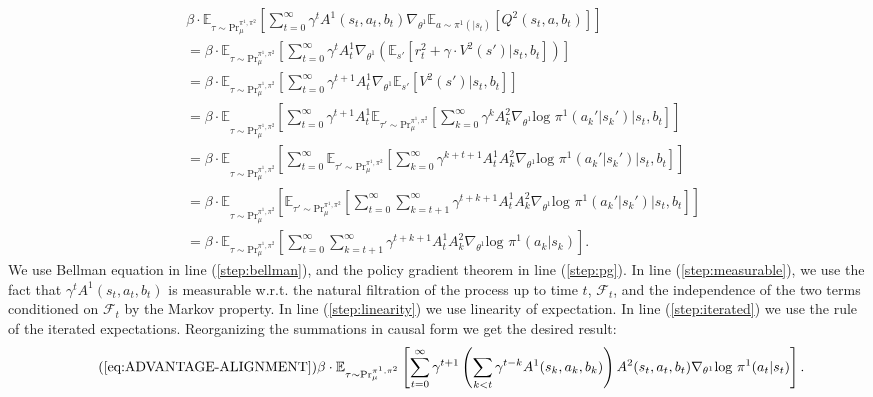 \documentclass{article} \usepackage{iclr2025_conference,times}
\begin{document}
\begin{align}
    &\beta \cdot \mathbb{E}_{\tau \sim \text{Pr}_{\mu}^{\pi^1, \pi^2}} \left[\sum_{t=0}^\infty \gamma^t A^{1}(s_t, a_t, b_t)\nabla_{\theta^1} \mathbb{E}_{a \sim \pi^1(|s_t)} [Q^2(s_t, a, b_t)] \right] \\
    &= \beta \cdot \mathbb{E}_{\tau \sim \text{Pr}_{\mu}^{\pi^1, \pi^2}} \left[\sum_{t=0}^\infty \gamma^t A^{1}_t\nabla_{\theta^1} \left( \mathbb{E}_{s'}\left[r^2_t + \gamma \cdot V^2(s')\biggr| s_t,b_t\right] \right) \right] \label{step:bellman}\\
    &= \beta \cdot \mathbb{E}_{\tau \sim \text{Pr}_{\mu}^{\pi^1, \pi^2}} \left[\sum_{t=0}^\infty \gamma^{t+1} A^{1}_t\nabla_{\theta^1} \mathbb{E}_{s'}\left[V^2(s')\biggr| s_t,b_t\right] \right]\\
    &= \beta \cdot \mathbb{E}\underset{\tau \sim \text{Pr}_{\mu}^{\pi^1, \pi^2}}{} \left[\sum_{t=0}^\infty \gamma^{t+1} A^{1}_t \mathbb{E}_{\tau' \sim \text{Pr}_{\mu}^{\pi^1, \pi^2}}\left[\sum_{k=0}^\infty \gamma^{k} A^{2}_k\nabla_{\theta^1}\text{log } \pi^1(a_k'|s_k')\biggr| s_t,b_t\right]  \right] \label{step:pg}\\
    &= \beta \cdot \mathbb{E}\underset{\tau \sim \text{Pr}_{\mu}^{\pi^1, \pi^2}}{} \left[\sum_{t=0}^\infty  \mathbb{E}_{\tau' \sim \text{Pr}_{\mu}^{\pi^1, \pi^2}}\left[\sum_{k=0}^\infty \gamma^{k+t+1} A^{1}_t  A^{2}_k\nabla_{\theta^1}\text{log } \pi^1(a_k'|s_k')\biggr| s_t,b_t\right]  \right] \label{step:measurable}\\
    &= \beta \cdot \mathbb{E}\underset{\tau \sim \text{Pr}_{\mu}^{\pi^1, \pi^2}}{} \left[\mathbb{E}_{\tau' \sim \text{Pr}_{\mu}^{\pi^1, \pi^2}}\left[\sum_{t=0}^\infty  \sum_{k=t+1}^\infty \gamma^{t+k+1} A^{1}_t  A^{2}_k\nabla_{\theta^1}\text{log } \pi^1(a_k'|s_k')\biggr| s_t,b_t \right]  \right] \label{step:linearity}\\
    &= \beta \cdot \mathbb{E}_{\tau \sim \text{Pr}_{\mu}^{\pi^1, \pi^2}} \left[\sum_{t=0}^\infty  \sum_{k=t+1}^\infty \gamma^{t+k+1} A^{1}_t  A^{2}_k\nabla_{\theta^1}\text{log } \pi^1(a_k|s_k) \right]. \label{step:iterated}
\end{align}
We use Bellman equation in line (\ref{step:bellman}), and the policy gradient theorem in line (\ref{step:pg}). In line (\ref{step:measurable}), we use the fact that $\gamma^t A^{1}(s_t, a_t, b_t)$ is measurable w.r.t. the natural filtration of the process up to time $t$, $\mathcal{F}_t$, and the independence of the two terms conditioned on $\mathcal{F}_t$ by the Markov property. In line (\ref{step:linearity}) we use linearity of expectation. In line (\ref{step:iterated}) we use the rule of the iterated expectations. Reorganizing the summations in causal form we get the desired result:
\begin{equation}
    \tag{\ref{eq:ADVANTAGE-ALIGNMENT}}
    \beta \cdot \mathbb{E}_{\tau \sim \text{Pr}_{\mu}^{\pi^1, \pi^2}} \left[\sum_{t=0}^\infty \gamma^{t+1} \left(\sum_{k<t}\gamma^{t-k} A^{1}(s_k, a_k, b_k)\right)  A^2(s_t, a_t, b_t)\nabla_{\theta^1}\text{log } \pi^1(a_t|s_t) \right].
\end{equation}
\end{document}
